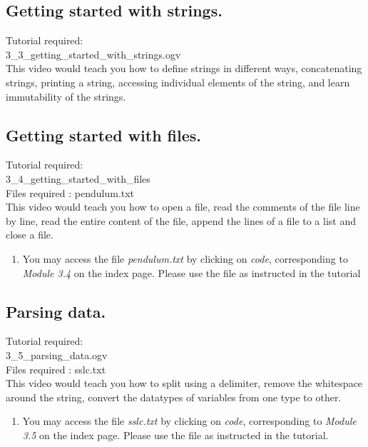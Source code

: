 \documentclass[11pt,twocolumn]{article}
\newenvironment{enumcpt}{\begin{enumerate} \topsep 0pt \partopsep 0pt 
                        \parsep 0pt
                        \itemsep 0pt \leftmargin -1in \rightmargin 0pt
                        }{\end{enumerate}}
\begin{document}
\subsection{Getting started with strings.}
Tutorial required: \\ 3\_3\_getting\_started\_with\_strings.ogv \\
This video would teach you how to define strings in different ways, concatenating strings, printing a string, accessing individual elements of the string, and learn immutability of the strings. 
\subsection{Getting started with files.}
Tutorial required: \\ 3\_4\_getting\_started\_with\_files \\
Files required : pendulum.txt \\
This video would teach you how to open a file, read the comments of the file line by line, read the entire content of the file, append the lines of a file to a list and close a file.
\begin{enumcpt}
\item You may access the file  \emph{pendulum.txt}  by clicking on \emph{code}, corresponding to \emph{Module 3.4} on the index page. Please use the file as instructed in the tutorial
\end{enumcpt}

\subsection{Parsing data.}
Tutorial required: \\ 3\_5\_parsing\_data.ogv \\
Files required : sslc.txt \\
This video would teach you how to split using a delimiter, remove the whitespace around the string, convert the datatypes  of variables from one type to other. 
\begin{enumcpt}
\item You may access the file  \emph{sslc.txt} by clicking on \emph{code}, corresponding to \emph{Module 3.5} on the index page. Please use the file as instructed in the tutorial. 
\end{enumcpt}
\end{document}
